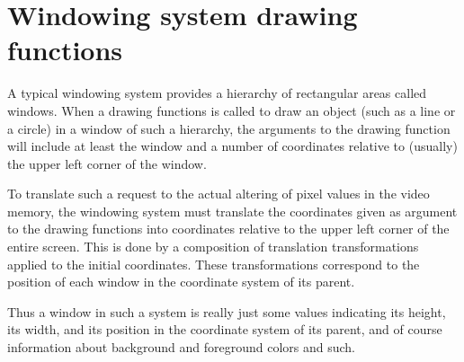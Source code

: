 \chapter{Windowing system drawing functions}

A typical windowing system provides a hierarchy of rectangular areas
called windows.  When a drawing functions is called to draw an object
(such as a line or a circle) in a window of such a hierarchy, the
arguments to the drawing function will include at least the window and a
number of coordinates relative to (usually) the upper left corner of the
window.

To translate such a request to the actual altering of pixel values in
the video memory, the windowing system must translate the coordinates
given as argument to the drawing functions into coordinates relative to
the upper left corner of the entire screen.  This is done by a
composition of translation transformations applied to the initial
coordinates.  These transformations correspond to the position of each
window in the coordinate system of its parent.

Thus a window in such a system is really just some values indicating its
height, its width, and its position in the coordinate system of its
parent, and of course information about background and foreground colors
and such.
